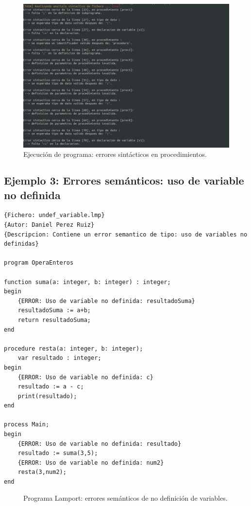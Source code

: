 \newpage
\begin{figure}[h]
    \includegraphics[width=\linewidth]{images/ejemplos/err_syntax/procedures.png}
    \caption{Ejecución de programa: errores sintácticos en procedimientos.}
    \label{fig:lamportErrSintaxProcedure_exec}
\end{figure}

\newpage
\subsection{Ejemplo 3: Errores semánticos: uso de variable no definida}
\begin{lstlisting}[style=lamportStyle]
{Fichero: undef_variable.lmp}
{Autor: Daniel Perez Ruiz}
{Descripcion: Contiene un error semantico de tipo: uso de variables no definidas}

program OperaEnteros

function suma(a: integer, b: integer) : integer;
begin
	{ERROR: Uso de variable no definida: resultadoSuma}
	resultadoSuma := a+b;
	return resultadoSuma;
end

procedure resta(a: integer, b: integer);
	var resultado : integer;
begin
	{ERROR: Uso de variable no definida: c}
	resultado := a - c;
	print(resultado);
end

process Main;
begin
	{ERROR: Uso de variable no definida: resultado}
	resultado := suma(3,5);
	{ERROR: Uso de variable no definida: num2}
	resta(3,num2);
end
\end{lstlisting}
\begin{figure}[h]
\caption{Programa Lamport: errores semánticos de no definición de variables.}
\label{fig:lamportErrSemanticUndef}
\end{figure}

